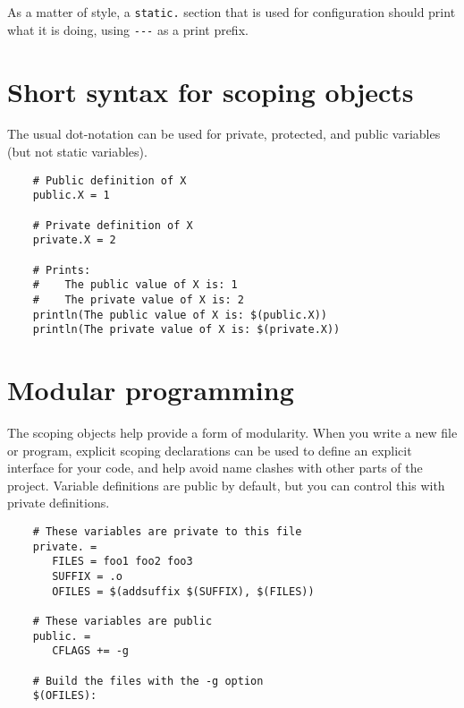 As a matter of style, a \verb+static.+ section that is used for configuration should print what it
is doing, using \verb+---+ as a print prefix.

\section{Short syntax for scoping objects}

The usual dot-notation can be used for private, protected, and public variables (but not
static variables).

\begin{verbatim}
    # Public definition of X
    public.X = 1

    # Private definition of X
    private.X = 2

    # Prints:
    #    The public value of X is: 1
    #    The private value of X is: 2
    println(The public value of X is: $(public.X))
    println(The private value of X is: $(private.X))
\end{verbatim}

\section{Modular programming}

The scoping objects help provide a form of modularity.  When you write a new file or program,
explicit scoping declarations can be used to define an explicit interface for your code, and help
avoid name clashes with other parts of the project.  Variable definitions are public by default, but
you can control this with private definitions.

\begin{verbatim}
    # These variables are private to this file
    private. =
       FILES = foo1 foo2 foo3
       SUFFIX = .o
       OFILES = $(addsuffix $(SUFFIX), $(FILES))

    # These variables are public
    public. =
       CFLAGS += -g

    # Build the files with the -g option
    $(OFILES):
\end{verbatim}


